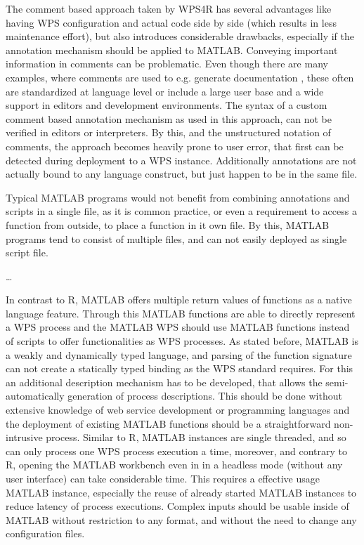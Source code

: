 	The comment based approach taken by WPS4R has several advantages like having \ac{WPS} configuration and actual code side by side (which results in less maintenance effort), but also introduces considerable drawbacks, especially if the annotation mechanism should be applied to MATLAB. Conveying important information in comments can be problematic. Even though there are many examples, where comments are used to e.g. generate documentation \citep[e.g Javadoc,][]{javadoc}, these often are standardized at language level or include a large user base and a wide support in editors and development environments. The syntax of a custom comment based annotation mechanism as used in this approach, can not be verified in editors or interpreters. By this, and the unstructured notation of comments, the approach becomes heavily prone to user error, that first can be detected during deployment to a WPS instance. Additionally annotations are not actually bound to any language construct, but just happen to be in the same file.

	Typical MATLAB programs would not benefit from combining annotations and scripts in a single file, as it is common practice, or even a requirement to access a function from outside, to place a function in it own file. By this, MATLAB programs tend to consist of multiple files, and can not easily deployed as single script file.

	\dots

	In contrast to R, MATLAB offers multiple return values of functions as a native language feature. Through this MATLAB functions are able to directly represent a \ac{WPS} process and the MATLAB WPS should use MATLAB functions instead of scripts to offer functionalities as WPS processes. As stated before, MATLAB is a weakly and dynamically typed language, and parsing of the function signature can not create a statically typed binding as the \ac{WPS} standard requires. For this an additional description mechanism has to be developed, that allows the semi-automatically generation of process descriptions. This should be done without extensive knowledge of web service development or programming languages and the deployment of existing MATLAB functions should be a straightforward non-intrusive process. Similar to R, MATLAB instances are single threaded, and so can only process one WPS process execution a time, moreover, and contrary to R, opening the MATLAB workbench even in in a headless mode (without any user interface) can take considerable time. This requires a effective usage MATLAB instance, especially the reuse of already started MATLAB instances to reduce latency of process executions. Complex inputs should be usable inside of MATLAB without restriction to any format, and without the need to change any configuration files.

